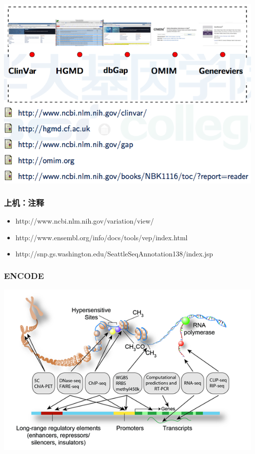 \documentclass[12pt]{beamer}
\begin{document}
\begin{frame}
  \includegraphics[width=\textwidth]{figures/old_slides/anno4.png}  
\end{frame}

\begin{frame}\frametitle{上机：注释}
  \small{
  \begin{itemize}
    \item http://www.ncbi.nlm.nih.gov/variation/view/
    \item http://www.ensembl.org/info/docs/tools/vep/index.html
    \item http://snp.gs.washington.edu/SeattleSeqAnnotation138/index.jsp
  \end{itemize}
  }
\end{frame}
\begin{frame}\frametitle{ENCODE}
  \includegraphics[width=\textwidth]{figures/encode.png}  
\end{frame}
\end{document}
